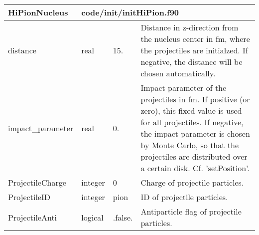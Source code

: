\documentclass{article}
\begin{document}

\begin{longtable}{llll}
\toprule
\textbf{\large{HiPionNucleus}} & \multicolumn{3}{l}{\footnotesize{code/init/initHiPion.f90}}\\*
\midrule
\endfirsthead
\midrule
\endhead
distance & \begin{minipage}[t]{2cm}real\end{minipage} & \begin{minipage}[t]{2cm}15.\end{minipage} & \begin{minipage}[t]{12cm}Distance in z-direction from the nucleus center in fm, where the projectiles are initialzed. If negative, the distance will be chosen automatically.\end{minipage}\\*
\midrule
impact\_parameter & \begin{minipage}[t]{2cm}real\end{minipage} & \begin{minipage}[t]{2cm}0.\end{minipage} & \begin{minipage}[t]{12cm}Impact parameter of the projectiles in fm. If positive (or zero), this fixed value is used for all projectiles. If negative, the impact parameter is chosen by Monte Carlo, so that the projectiles are distributed over a certain disk. Cf. 'setPosition'.\end{minipage}\\*
\midrule
ProjectileCharge & \begin{minipage}[t]{2cm}integer\end{minipage} & \begin{minipage}[t]{2cm}0\end{minipage} & \begin{minipage}[t]{12cm}Charge of projectile particles.\end{minipage}\\*
\midrule
ProjectileID & \begin{minipage}[t]{2cm}integer\end{minipage} & \begin{minipage}[t]{2cm}pion\end{minipage} & \begin{minipage}[t]{12cm}ID of projectile particles.\end{minipage}\\*
\midrule
ProjectileAnti & \begin{minipage}[t]{2cm}logical\end{minipage} & \begin{minipage}[t]{2cm}.false.\end{minipage} & \begin{minipage}[t]{12cm}Antiparticle flag of projectile particles.\end{minipage}\\*

\end{longtable}
\end{document}
